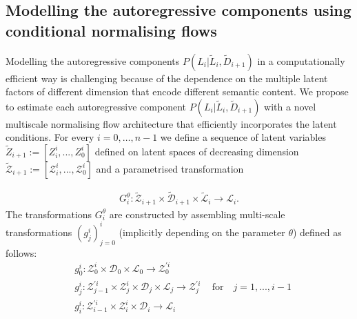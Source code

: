 \subsection{Modelling the autoregressive components using conditional normalising flows}\label{ch1:Autoregressive-conditional-flow-components}
%

Modelling the autoregressive components $P(L_i|\tilde{L}_{i},\tilde D_{i+1})$ in a computationally efficient way is challenging because of the dependence on the multiple latent factors of different dimension that encode different semantic content. We propose to estimate each autoregressive component $P(L_i|\tilde{L}_{i},\tilde D_{i+1})$ with a novel multiscale normalising flow architecture that efficiently incorporates the latent conditions. \color{black}For every $i=0, \ldots, n-1$ we define a sequence of latent variables $\tilde Z_{i+1} := [Z_{i}^{i},...,Z_0^{i}]$ defined on latent spaces of decreasing dimension $\tilde{\mathcal{Z}}_{i+1} := [\mathcal{Z}_{i}^{i},...,\mathcal{Z}_0^{i}]$ and a parametrised transformation

\begin{align*}
    G^\theta_i : \tilde{\mathcal{Z}}_{i+1} \times  \tilde{\mathcal{D}}_{i+1} \times  \tilde{\mathcal{L}}_{i} \rightarrow \mathcal{L}_{i}.
    \end{align*}
    The transformations $G^\theta_i$ are constructed by assembling multi-scale transformations $(g_j^i)_{j=0}^i$ (implicitly depending on the parameter $\theta$) defined as follows:
    \begin{align*}
    &g_0^i : \mathcal{Z}_0^i \times \mathcal{D}_0 \times \mathcal{L}_0 \rightarrow \mathcal{Z}_{0}^{\prime i} \\   
     &  g_{j}^{i}:\mathcal{Z}_{j-1}^{\prime i}\times \mathcal{Z}_{j}^{i} \times \mathcal{D}_{j} \times  \mathcal{L}_{j} \rightarrow \mathcal{Z}_{j}^{\prime i}\, \quad \text{for} \quad j=1,...,i-1\\
    &g_{i}^{i}: \mathcal{Z}_{i-1}^{\prime i}\times \mathcal{Z}_{i}^i \times \mathcal{D}_{i} \rightarrow     \mathcal{L}_{i}
\end{align*}

